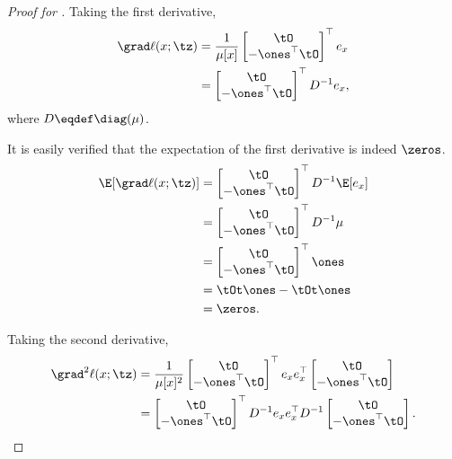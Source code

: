 \begin{proof}[Proof for ]
Taking the first derivative,
\begin{align}
  \grad \ell(x; \tz)
  &= 
  \frac{
  1}{\mu[x]}
  \begin{bmatrix}
    \tO \\
    -\ones^\top \tO
  \end{bmatrix}^\top
 e_x \nonumber \\
  &= 
  \begin{bmatrix}
    \tO \\
    -\ones^\top \tO
  \end{bmatrix}^\top
  D^{-1} e_x, \label{eqn:lhood-grad}
\end{align}
where $D \eqdef \diag(\mu)$.

It is easily verified that the expectation of the first derivative is indeed $\zeros$.
\begin{align*}
  \E[\grad \ell(x; \tz)]
  &= 
  \begin{bmatrix}
    \tO \\
    -\ones^\top \tO
  \end{bmatrix}^\top
  D^{-1} \E[e_x] \\
  &= 
  \begin{bmatrix}
    \tO \\
    -\ones^\top \tO
  \end{bmatrix}^\top
  D^{-1} \mu \\
  &= 
  \begin{bmatrix}
    \tO \\
    -\ones^\top \tO
  \end{bmatrix}^\top
  \ones \\
  &= \tOt\ones - \tOt\ones \\
  &= \zeros.
\end{align*}

Taking the second derivative,
\begin{align}
  \grad^2 \ell(x; \tz)
  &= 
  \frac{
  1}{\mu[x]^2}
  \begin{bmatrix}
    \tO \\
    -\ones^\top \tO
  \end{bmatrix}^\top
 e_x e_x^\top 
  \begin{bmatrix}
    \tO \\
    -\ones^\top \tO
  \end{bmatrix}
  \nonumber
 \\ 
  &= 
  \begin{bmatrix}
    \tO \\
    -\ones^\top \tO
  \end{bmatrix}^\top
    D^{-1} e_x e_x^\top D^{-1} 
  \begin{bmatrix}
    \tO \\
    -\ones^\top \tO
  \end{bmatrix}. \label{eqn:lhood-hess}%
\end{align}


\end{proof}
